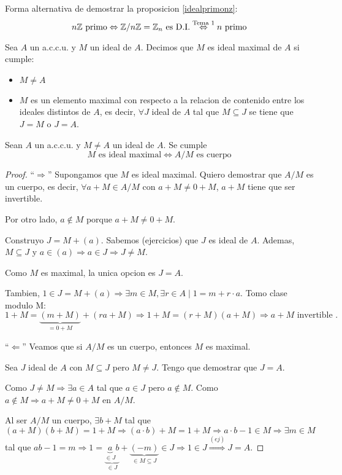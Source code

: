 \begin{example}
	Forma alternativa de demostrar la proposicion \ref{idealprimonz}:
	\[
		n\mathbb{Z} \text{ primo} \Leftrightarrow \mathbb{Z} / n\mathbb{Z} = \mathbb{Z}_n \text{ es D.I.} \overset{\text{Tema 1}}{\Leftrightarrow} n \text{ primo}
	\]
\end{example}
\begin{definition}
	Sea \(A \) un a.c.c.u. y \(M \) un ideal de \(A \). Decimos que \(M \) es ideal maximal de \(A \) si cumple:
	\begin{itemize}
		\item \(M \neq A \)
		\item \(M \) es un elemento maximal con respecto a la relacion de contenido entre los ideales distintos de \(A \), es decir, \(\forall J \) ideal de \(A \) tal que \(M \subseteq J \) se tiene que \(J = M \) o \(J = A \).
	\end{itemize}
\end{definition}
\begin{proposition}
	\label{maximal}
	Sean \(A \) un a.c.c.u. y \(M \neq A \) un ideal de \(A \). Se cumple
	\[
		M \text{ es ideal maximal} \iff A / M \text{ es cuerpo}
	\]
\end{proposition}
\begin{proof}
	``\(\Rightarrow \)'' Supongamos que \(M \) es ideal maximal. Quiero demostrar que \(A / M \) es un cuerpo, es decir, \(\forall a + M \in A / M  \) con \(a + M \neq 0 + M \), \(a + M \) tiene que ser invertible.
	
	Por otro lado, \(a \notin M \) porque \(a + M \neq 0 + M \).
	
	Construyo \(J = M + (a )\). Sabemos (ejercicios) que \(J \) es ideal de \(A \). Ademas, \(M \subseteq J \) y \(a \in (a ) \Rightarrow a \in J \Rightarrow J \neq M\).
	
	Como \(M \) es maximal, la unica opcion es \(J = A \).
	
	Tambien, \(1 \in J = M + (a ) \Rightarrow \exists m \in M, \exists r \in A \mid 1 = m + r \cdot a \). Tomo clase modulo M:
	\[
		1 + M = \underbrace{(m + M)}_{= 0 + M } + (ra + M) \Rightarrow 1 + M = (r + M) (a + M) \Rightarrow a + M \text{ invertible }.
	\]
	
	``\(\Leftarrow \)'' Veamos que si \(A / M \) es un cuerpo, entonces \(M \) es maximal.
	
	Sea \(J \) ideal de \(A \) con \(M \subseteq J \) pero \(M \neq J \). Tengo que demostrar que \(J = A \).
	
	Como \(J \neq M \Rightarrow \exists a \in A\) tal que \(a \in J \) pero \(a \notin M \). Como \(a \notin M \Rightarrow a + M \neq 0 + M \) en \(A / M \).
	
	Al ser \(A / M \) un cuerpo, \(\exists b + M \) tal que \((a + M)(b + M) = 1 + M \Rightarrow (a \cdot b) + M = 1 + M \Rightarrow a \cdot b - 1 \in M \Rightarrow \exists m \in M \) tal que \(ab - 1 = m \Rightarrow 1 = \underbrace{\underbrace{a}_{\in J}b}_{\in  J} + \underbrace{(-m)}_{\in M \subseteq J} \in J \Rightarrow 1 \in J \overset{(ej)}{\Rightarrow} J = A\).
\end{proof}
